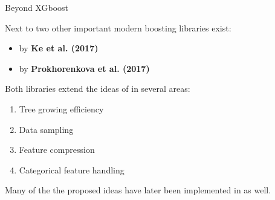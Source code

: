 \documentclass[11pt,compress,t,notes=noshow, xcolor=table]{beamer}
\begin{document}


\begin{vbframe}{Beyond XGboost}

Next to  two other important modern boosting libraries exist:

\lz

\begin{itemize}
  \item {} by \textbf{Ke et al. (2017)}
  \item {} by \textbf{Prokhorenkova et al. (2017)}
\end{itemize}

\lz

Both libraries extend the ideas of  in several areas:

\lz

\begin{enumerate}
  \item Tree growing efficiency
  \item Data sampling
  \item Feature compression
  \item Categorical feature handling
\end{enumerate}

\lz

Many of the the proposed ideas have later been implemented in  as well.


\end{vbframe}
\end{document}
